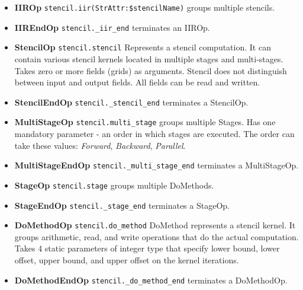 \documentclass[sigplan,\review anonymous]{acmart}
\begin{document}
\begin{itemize}
  \item \textbf{IIROp} \texttt{stencil.iir(StrAttr:\$stencilName)} groups
  multiple stencils.
  \item \textbf{IIREndOp} \texttt{stencil.\_iir\_end} terminates an IIROp. 
  \item \textbf{StencilOp} \texttt{stencil.stencil} Represents a stencil
  computation. It can contain various stencil kernels located in multiple
  stages and multi-stages. Takes zero or more fields (grids) as arguments.
  Stencil does not distinguish between input and output fields. All fields
  can be read and written.
  \item \textbf{StencilEndOp} \texttt{stencil.\_stencil\_end} terminates
  a StencilOp.
  \item \textbf{MultiStageOp} \texttt{stencil.multi\_stage} groups multiple
  Stages. Has one mandatory parameter - an order in which stages are executed.
  The order can take these values: \textit{Forward}, \textit{Backward},
  \textit{Parallel}.
  \item \textbf{MultiStageEndOp} \texttt{stencil.\_multi\_stage\_end}
  terminates a MultiStageOp.
  \item \textbf{StageOp} \texttt{stencil.stage} groups multiple DoMethods.
  \item \textbf{StageEndOp} \texttt{stencil.\_stage\_end} terminates
  a StageOp.
  \item \textbf{DoMethodOp} \texttt{stencil.do\_method} DoMethod represents
  a stencil kernel. It groups arithmetic, read, and write operations that do
  the actual computation. Takes 4 static parameters of integer type that
  specify lower bound, lower offset, upper bound, and upper offset on the
  kernel iterations.
  \item \textbf{DoMethodEndOp} \texttt{stencil.\_do\_method\_end} terminates
  a DoMethodOp.
\end{itemize}
\end{document}

